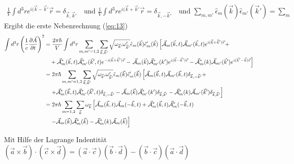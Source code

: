 \begin{align}
  \label{eq:14}
  \frac{1}{V}\int d^3 r e^{i(\vec k - \vec k'}\vec r = \delta_{\vec k,\vec k'} \quad\text{und }  \frac{1}{V}\int d^3 r e^{i(\vec k +\vec k'}\vec r = \delta_{\vec k, - \vec k'}\quad \text{und } \sum_{m,m'}\hat\epsilon_m(\vec k)\hat\epsilon_{m'}(\vec k') = \sum_{m}
\end{align}
Ergibt die erste Nebenrechnung (\ref{eq:13})
\begin{align}
  \label{eq:15}
  \int d^3r  \left( \frac{1}{c} \pdiff{\vec A}_t \right)^2 &=  \frac{2\pi\hbar}{V} \int d^3r  \sum_{m,m'=1,2} \sum_{\vec k,\vec k'}   \sqrt{\omega_{\vec k'}\omega'_{\vec k'}} \hat \epsilon_m(\vec k) \hat \epsilon'_m(\vec k)  
\left[ \vec{\mathcal A}_m (\vec k,t) \vec{\mathcal A}_{m'} (\vec k,t)e^{i(\vec k+\vec k')\vec r} + \right. \notag\\
&\quad +  \vec{\mathcal A}^*_m (\vec k,t) \vec{\mathcal A}^*_{m'} (\vec k',t) e^{-i(\vec k+\vec k')\vec r} 
- \left.\vec{\mathcal A}_{m} (\vec k)  \vec{\mathcal A}^*_{m'} (k') e^{i(\vec k-\vec k')\vec r} 
 - \vec{\mathcal A}^*_m (k) \vec{\mathcal A}_{m'} (\vec k') e^{i(\vec k'-\vec k)\vec r}    \right] \notag\\
%
&=  2\pi\hbar \sum_{m,m'=1,2} \sum_{\vec k,\vec k'}   \sqrt{\omega_{\vec k'}\omega'_{\vec k'}} \hat \epsilon_m(\vec k) \hat \epsilon'_m(\vec k)  
\left[ \vec{\mathcal A}_m (\vec k,t) \vec{\mathcal A}_{m'} (\vec k,t)\delta_{\vec k,-\vec k'}   + \right. \notag\\
&\quad\left. +  \vec{\mathcal A}^*_m (\vec k,t) \vec{\mathcal A}^*_{m'} (\vec k',t) \delta_{\vec k, - \vec k'} 
- \vec{\mathcal A}_{m} (\vec k)  \vec{\mathcal A}^*_{m'} (k')  \delta_{\vec k,\vec k'}
 - \vec{\mathcal A}^*_m (k) \vec{\mathcal A}_{m'} (\vec k')    \delta_{\vec k,\vec k'}  \right] \notag\\
%
&=  2\pi\hbar \sum_{m=1,2} \sum_{\vec k} \omega_{\vec k}  
\left[ \vec{\mathcal A}_m (\vec k,t) \vec{\mathcal A}_{m} (- \vec k,t)   + 
  \vec{\mathcal A}^*_m (\vec k,t) \vec{\mathcal A}^*_{m} (- \vec k,t)  \right.\notag\\
&\quad\left. - \vec{\mathcal A}_{m} (\vec k)  \vec{\mathcal A}^*_{m} (\vec k) 
 - \vec{\mathcal A}^*_m (k) \vec{\mathcal A}_{m} (\vec k)  \right] \notag\\
\end{align}




Mit Hilfe der Lagrange Indentität \((\vec a\times\vec b)\cdot(\vec c\times\vec d) = (\vec a\cdot\vec c)(\vec b\cdot\vec d) - (\vec b \cdot \vec c)(\vec a\cdot\vec d) \)

